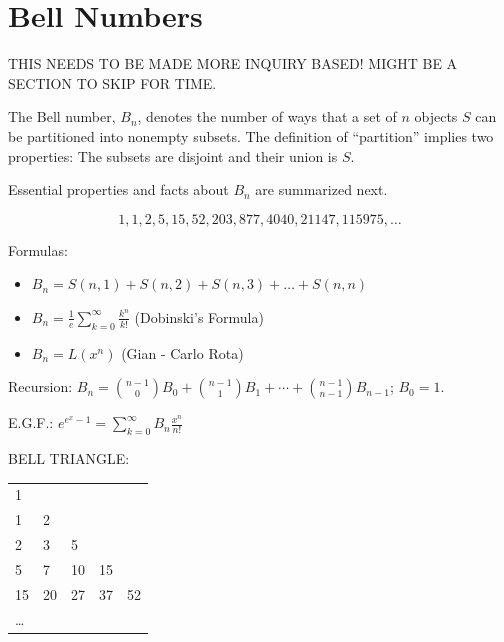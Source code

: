 \documentclass[10pt,]{book}
\theoremstyle{plain}
\theoremstyle{definition}
\theoremstyle{definition}
\theoremstyle{definition}
\theoremstyle{definition}
\numberwithin{equation}{chapter}
\begin{document}
\section[{Bell Numbers}]{Bell Numbers}\label{sec_adv-bell}
\hypertarget{p-1232}{}%
THIS NEEDS TO BE MADE MORE INQUIRY BASED!  MIGHT BE A SECTION TO SKIP FOR TIME.%
\par
\hypertarget{p-1233}{}%
The Bell number, \(B_{n}\), denotes the number of ways that a set of \(n\) objects \(S\) can be partitioned into nonempty subsets. The definition of ``partition'' implies two properties: The subsets are disjoint and their union is \(S\).%
\par
\hypertarget{p-1234}{}%
Essential properties and facts about \(B_{n}\) are summarized next.%
\begin{assemblage}\label{assemblage-14}
\hypertarget{p-1235}{}%
%
\begin{equation*}
1, 1, 2, 5, 15, 52, 203, 877, 4040, 21147, 115975, \ldots
\end{equation*}
%
\par
\hypertarget{p-1236}{}%
Formulas: %
\begin{itemize}[label=\textbullet]
\item{}\(B_{n} = S\left( n,1 \right) + S\left( n,2 \right) + S\left( n,3 \right) + \ldots + S(n,n)\)%
\item{}\(B_{n} = \frac{1}{e}\sum_{k=0}^{\infty}\frac{k^{n}}{k!}\) (Dobinski's Formula)%
\item{}\(B_{n} = L\left( x^{n} \right)\) (Gian - Carlo Rota)%
\end{itemize}
%
\par
\hypertarget{p-1237}{}%
Recursion: \(B_{n} = \binom{n - 1}{0}B_{0} + \binom{n - 1}{1}B_{1} + \cdots + \binom{n - 1}{n - 1}B_{n - 1}\); \(B_{0} = 1\).%
\par
\hypertarget{p-1238}{}%
E.G.F.: \(e^{e^{x} - 1} = \sum_{k = 0}^{\infty}{B_{n}\frac{x^{n}}{n!}}\)%
\par
\hypertarget{p-1239}{}%
BELL TRIANGLE:%
\begin{sidebyside}{1}{0.25}{0.25}{0}
\begin{sbspanel}{0.5}
{\centering%
\begin{tabular}{lllll}
1&&&&\tabularnewline[0pt]
1&2&&&\tabularnewline[0pt]
2&3&5&&\tabularnewline[0pt]
5&7&10&15&\tabularnewline[0pt]
15&20&27&37&52\tabularnewline[0pt]
\ldots&&&&
\end{tabular}
\par}
\end{sbspanel}
\end{sidebyside}
\end{assemblage}
\end{document}
